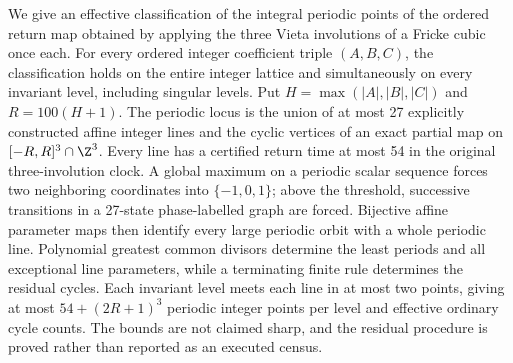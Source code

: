 We give an effective classification of the integral periodic points of
the ordered return map obtained by applying the three Vieta involutions
of a Fricke cubic once each. For every ordered integer coefficient triple
\((A,B,C)\), the classification holds on the entire integer lattice and
simultaneously on every invariant level, including singular levels.
Put \(H=\max(|A|,|B|,|C|)\) and \(R=100(H+1)\).
The periodic locus is the union of at most 27 explicitly constructed
affine integer lines and the cyclic vertices of an exact partial map
on \([-R,R]^3\cap\Z^3\). Every line has a certified return time at
most 54 in the original three-involution clock. A global maximum on a
periodic scalar sequence forces two neighboring coordinates into
\(\{-1,0,1\}\); above the threshold, successive transitions in a
27-state phase-labelled graph are forced. Bijective affine parameter
maps then identify every large periodic orbit with a whole periodic
line. Polynomial greatest common divisors determine the least periods
and all exceptional line parameters, while a terminating finite rule
determines the residual cycles. Each invariant level meets each line
in at most two points, giving at most \(54+(2R+1)^3\) periodic integer
points per level and effective ordinary cycle counts. The bounds are
not claimed sharp, and the residual procedure is proved rather than
reported as an executed census.
